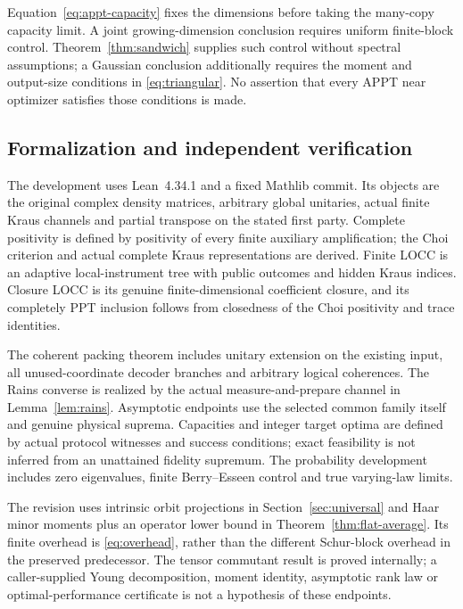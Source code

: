 Equation~\eqref{eq:appt-capacity} fixes the dimensions before taking the many-copy capacity limit. A joint growing-dimension conclusion requires uniform finite-block control. Theorem~\ref{thm:sandwich} supplies such control without spectral assumptions; a Gaussian conclusion additionally requires the moment and output-size conditions in \eqref{eq:triangular}. No assertion that every APPT near optimizer satisfies those conditions is made.

\subsection{Formalization and independent verification}
The development uses Lean~4.34.1 and a fixed Mathlib commit. Its objects are the original complex density matrices, arbitrary global unitaries, actual finite Kraus channels and partial transpose on the stated first party. Complete positivity is defined by positivity of every finite auxiliary amplification; the Choi criterion and actual complete Kraus representations are derived. Finite LOCC is an adaptive local-instrument tree with public outcomes and hidden Kraus indices. Closure LOCC is its genuine finite-dimensional coefficient closure, and its completely PPT inclusion follows from closedness of the Choi positivity and trace identities.

The coherent packing theorem includes unitary extension on the existing input, all unused-coordinate decoder branches and arbitrary logical coherences. The Rains converse is realized by the actual measure-and-prepare channel in Lemma~\ref{lem:rains}. Asymptotic endpoints use the selected common family itself and genuine physical suprema. Capacities and integer target optima are defined by actual protocol witnesses and success conditions; exact feasibility is not inferred from an unattained fidelity supremum. The probability development includes zero eigenvalues, finite Berry--Esseen control and true varying-law limits.

The revision uses intrinsic orbit projections in Section~\ref{sec:universal} and Haar minor moments plus an operator lower bound in Theorem~\ref{thm:flat-average}. Its finite overhead is \eqref{eq:overhead}, rather than the different Schur-block overhead in the preserved predecessor. The tensor commutant result is proved internally; a caller-supplied Young decomposition, moment identity, asymptotic rank law or optimal-performance certificate is not a hypothesis of these endpoints.

